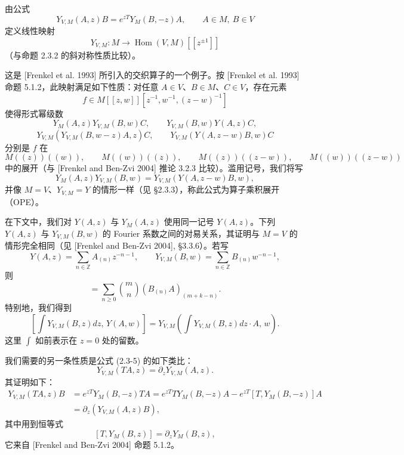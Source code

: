 由公式
\begin{equation}
    Y_{V,M}(A,z)B=e^{zT}Y_M(B,-z)A,\qquad A\in M,\ B\in V
    \tag{7.2-1}
\end{equation}
定义线性映射
\[
    Y_{V,M}:M\longrightarrow\operatorname{Hom}(V,M)[[z^{\pm1}]]
\]
（与命题 2.3.2 的斜对称性质比较）。

这是 [Frenkel et al. 1993] 所引入的交织算子的一个例子。按 [Frenkel et al. 1993] 命题 5.1.2，此映射满足如下性质：对任意 $A\in V$、$B\in M$、$C\in V$，存在元素
\[
    f\in M[[z,w]][z^{-1},w^{-1},(z-w)^{-1}]
\]
使得形式幂级数
\[
    Y_M(A,z)Y_{V,M}(B,w)C,\qquad Y_{V,M}(B,w)Y(A,z)C,
\]
\[
    Y_{V,M}(Y_{V,M}(B,w-z)A,z)C,\qquad Y_{V,M}(Y(A,z-w)B,w)C
\]
分别是 $f$ 在
\[
    M((z))((w)),\qquad M((w))((z)),\qquad M((z))((z-w)),\qquad M((w))((z-w))
\]
中的展开（与 [Frenkel and Ben-Zvi 2004] 推论 3.2.3 比较）。滥用记号，我们将写
\[
    Y_M(A,z)Y_{V,M}(B,w)=Y_{V,M}(Y(A,z-w)B,w),
\]
并像 $M=V$、$Y_{V,M}=Y$ 的情形一样（见 §2.3.3），称此公式为算子乘积展开（OPE）。

在下文中，我们对 $Y(A,z)$ 与 $Y_M(A,z)$ 使用同一记号 $Y(A,z)$。下列 $Y(A,z)$ 与 $Y_{V,M}(B,w)$ 的 Fourier 系数之间的对易关系，其证明与 $M=V$ 的情形完全相同（见 [Frenkel and Ben-Zvi 2004], §3.3.6）。若写
\[
    Y(A,z)=\sum_{n\in\mathbb{Z}}A_{(n)}z^{-n-1},\qquad
    Y_{V,M}(B,w)=\sum_{n\in\mathbb{Z}}B_{(n)}w^{-n-1},
\]
则
\begin{equation}
    [B_{(m)},A_{(k)}]=\sum_{n\ge0}\binom{m}{n}(B_{(n)}A)_{(m+k-n)}.
    \tag{7.2-2}
\end{equation}
特别地，我们得到
\begin{equation}
    \left[\int Y_{V,M}(B,z)dz,\,Y(A,w)\right]
    =Y_{V,M}\left(\int Y_{V,M}(B,z)dz\cdot A,\,w\right).
    \tag{7.2-3}
\end{equation}
这里 $\int$ 如前表示在 $z=0$ 处的留数。

我们需要的另一条性质是公式 (2.3-5) 的如下类比：
\begin{equation}
    Y_{V,M}(TA,z)=\partial_zY_{V,M}(A,z).
    \tag{7.2-4}
\end{equation}
其证明如下：
\begin{align*}
    Y_{V,M}(TA,z)B&=e^{zT}Y_M(B,-z)TA=e^{zT}TY_M(B,-z)A-e^{zT}[T,Y_M(B,-z)]A\\
    &=\partial_z(Y_{V,M}(A,z)B),
\end{align*}
其中用到恒等式
\[
    [T,Y_M(B,z)]=\partial_zY_M(B,z),
\]
它来自 [Frenkel and Ben-Zvi 2004] 命题 5.1.2。

